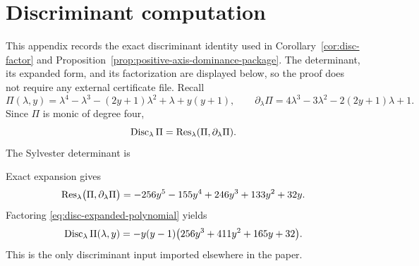 \section{Discriminant computation}\label{app:disc}

This appendix records the exact discriminant identity used in Corollary~\ref{cor:disc-factor} and Proposition~\ref{prop:positive-axis-dominance-package}.  The determinant, its expanded form, and its factorization are displayed below, so the proof does not require any external certificate file.
Recall
\[
\Pi(\lambda,y)=\lambda^4-\lambda^3-(2y+1)\lambda^2+\lambda+y(y+1),
\qquad
\partial_\lambda\Pi=4\lambda^3-3\lambda^2-2(2y+1)\lambda+1.
\]
Since \(\Pi\) is monic of degree four,
\[
\operatorname{Disc}_\lambda\Pi=\operatorname{Res}_\lambda(\Pi,\partial_\lambda\Pi).
\]
The Sylvester determinant is
\begin{center}
\end{center}
Exact expansion gives
\begin{equation}\label{eq:disc-expanded-polynomial}
\operatorname{Res}_\lambda\bigl(\Pi,\partial_\lambda\Pi\bigr)
=
-256y^5-155y^4+246y^3+133y^2+32y.
\end{equation}
Factoring \eqref{eq:disc-expanded-polynomial} yields
\[
\operatorname{Disc}_{\lambda}\Pi(\lambda,y)=-y(y-1)\bigl(256y^3+411y^2+165y+32\bigr).
\]
This is the only discriminant input imported elsewhere in the paper.
